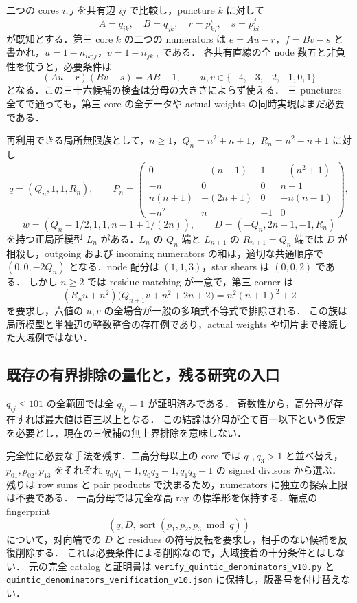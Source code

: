 二つの cores $i,j$ を共有辺 $ij$ で比較し，puncture $k$ に対して
\[
 A=q_{ik},\quad B=q_{jk},\quad r=p^i_{kj},\quad s=p^j_{ki}
\]
が既知とする．第三 core $k$ の二つの numerators は
$e=Au-r$，$f=Bv-s$ と書かれ，$u=1-n_{ik;j}$，$v=1-n_{jk;i}$ である．
各共有直線の全 node 数五と非負性を使うと，必要条件は
\[
 (Au-r)(Bv-s)=AB-1,
 \qquad u,v\in\{-4,-3,-2,-1,0,1\}
\]
となる．この三十六候補の検査は分母の大きさによらず使える．
三 punctures 全てで通っても，第三 core の全データや actual weights の同時実現はまだ必要である．

再利用できる局所無限族として，$n\geq1$，$Q_n=n^2+n+1$，$R_n=n^2-n+1$ に対し
\[
 q=(Q_n,1,1,R_n),\qquad
 P_n=\begin{pmatrix}
 0&-(n+1)&1&-(n^2+1)\\
 -n&0&0&n-1\\
 n(n+1)&-(2n+1)&0&-n(n-1)\\
 -n^2&n&-1&0
 \end{pmatrix},
\]
\[
 w=(Q_n-1/2,1,1,n-1+1/(2n)),\qquad
 D=(-Q_n,2n+1,-1,R_n)
\]
を持つ正局所模型 $L_n$ がある．$L_n$ の $Q_n$ 端と $L_{n+1}$ の $R_{n+1}=Q_n$ 端では
$D$ が相殺し，outgoing および incoming numerators の和は，適切な共通順序で
$(0,0,-2Q_n)$ となる．node 配分は $(1,1,3)$，star shears は $(0,0,2)$ である．
しかし $n\geq2$ では residue matching が一意で，第三 corner は
\[
 (R_nu+n^2)\bigl(Q_{n+1}v+n^2+2n+2\bigr)
   =n^2(n+1)^2+2
\]
を要求し，六値の $u,v$ の全場合が一般の多項式不等式で排除される．
この族は局所模型と単独辺の整数整合の存在例であり，actual weights や切片まで接続した大域例ではない．

\subsection{既存の有界排除の量化と，残る研究の入口}

$q_{ij}\le101$ の全範囲では全 $q_{ij}=1$ が証明済みである．
奇数性から，高分母が存在すれば最大値は百三以上となる．
この結論は分母が全て百一以下という仮定を必要とし，現在の三候補の無上界排除を意味しない．

完全性に必要な手法を残す．二高分母以上の core では $q_0,q_3>1$ と並べ替え，
$p_{01},p_{02},p_{13}$ をそれぞれ $q_0q_1-1,q_0q_2-1,q_1q_3-1$ の signed divisors から選ぶ．
残りは row sums と pair products で決まるため，numerators に独立の探索上限は不要である．
一高分母では完全な高 ray の標準形を保持する．端点の fingerprint
\[
 \left(q,D,\operatorname{sort}(p_1,p_2,p_3\bmod q)\right)
\]
について，対向端での $D$ と residues の符号反転を要求し，相手のない候補を反復削除する．
これは必要条件による削除なので，大域接着の十分条件とはしない．
元の完全 catalog と証明書は
\nolinkurl{verify_quintic_denominators_v10.py} と
\nolinkurl{quintic_denominators_verification_v10.json} に保持し，版番号を付け替えない．

